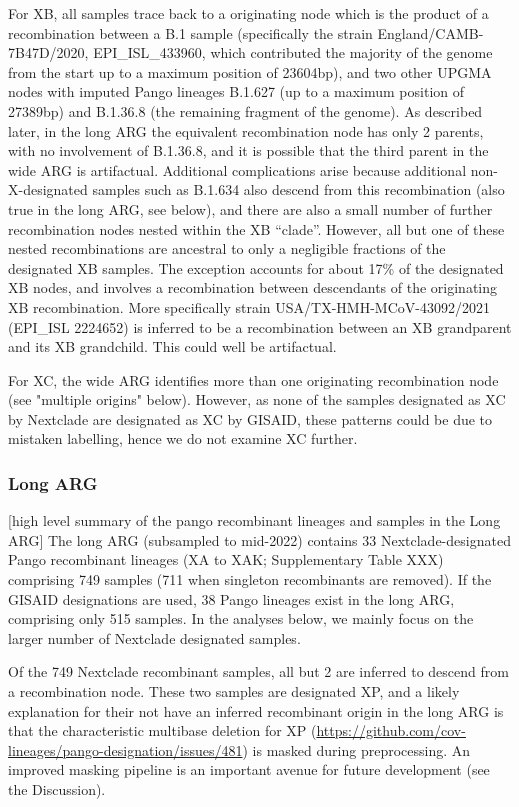 \documentclass{article}
\begin{document}
For XB, all samples trace back to a originating node which is the product of a
recombination between a B.1 sample (specifically the strain
England/CAMB-7B47D/2020, EPI\_ISL\_433960, which contributed the majority of
the genome from the start up to a maximum position of 23604bp), and two other
UPGMA nodes with imputed Pango lineages B.1.627 (up to a maximum position of
27389bp) and B.1.36.8 (the remaining fragment of the genome). As described
later, in the long ARG the equivalent recombination node has only 2 parents,
with no involvement of  B.1.36.8, and it is possible that the third parent in
the wide ARG is artifactual. Additional complications arise because additional
non-X-designated samples such as B.1.634 also descend from this recombination
(also true in the long ARG, see below), and there are also a small number of
further recombination nodes nested within the XB ``clade''. However, all but
one of these nested recombinations are ancestral to only a negligible fractions
of the designated XB samples. The exception accounts for about 17\% of the
designated XB nodes, and involves a recombination between descendants of the
originating XB recombination. More specifically strain
USA/TX-HMH-MCoV-43092/2021 (EPI\_ISL 2224652) is inferred to be a recombination
between an XB grandparent and its XB grandchild. This could well be
artifactual.

For XC, the wide ARG identifies more than one originating recombination node
(see "multiple origins" below). However, as none of the samples designated as
XC by Nextclade are designated as XC by GISAID, these patterns could be due to
mistaken labelling, hence we do not examine XC further.

\subsubsection{Long ARG}
[high level summary of the pango recombinant lineages
and samples in the Long ARG]
The long ARG (subsampled to mid-2022) contains 33
Nextclade-designated Pango recombinant lineages (XA to XAK; Supplementary Table
XXX) comprising 749 samples (711 when singleton recombinants are removed). If
the GISAID designations are used, 38 Pango lineages exist in the long ARG,
comprising only 515 samples. In the analyses below, we mainly focus on the
larger number of Nextclade designated samples.

Of the 749 Nextclade recombinant samples, all but 2 are inferred to descend
from a recombination node. These two samples are designated XP, and a likely
explanation for their not have an inferred recombinant origin in the long ARG
is that the characteristic multibase deletion for XP
(\url{https://github.com/cov-lineages/pango-designation/issues/481}) is masked
during preprocessing. An improved masking pipeline is an important avenue for
future development (see the Discussion).
\end{document}
